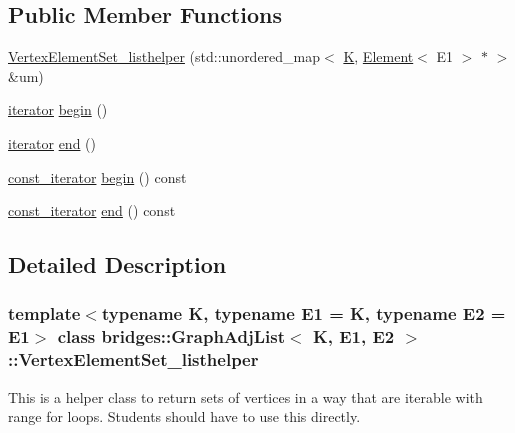 \subsection*{Public Member Functions}
\begin{DoxyCompactItemize}
\item 
\hyperlink{classbridges_1_1_graph_adj_list_1_1_vertex_element_set__listhelper_aad766132f1eb8eef63d8b5aae1131db0}{Vertex\+Element\+Set\+\_\+listhelper} (std\+::unordered\+\_\+map$<$ \hyperlink{namespacebridges_acfb0a4f7877d8f63de3e6862004c50edaa5f3c6a11b03839d46af9fb43c97c188}{K}, \hyperlink{classbridges_1_1_element}{Element}$<$ E1 $>$ $\ast$ $>$ \&um)
\item 
\hyperlink{classbridges_1_1_graph_adj_list_1_1_vertex_element_set__listhelper_1_1iterator}{iterator} \hyperlink{classbridges_1_1_graph_adj_list_1_1_vertex_element_set__listhelper_ad9feeff9bb589dc9d13d1dd562a0e7ea}{begin} ()
\item 
\hyperlink{classbridges_1_1_graph_adj_list_1_1_vertex_element_set__listhelper_1_1iterator}{iterator} \hyperlink{classbridges_1_1_graph_adj_list_1_1_vertex_element_set__listhelper_aea97cdb87e88d3848e6451d1cfc62f2d}{end} ()
\item 
\hyperlink{classbridges_1_1_graph_adj_list_1_1_vertex_element_set__listhelper_1_1const__iterator}{const\+\_\+iterator} \hyperlink{classbridges_1_1_graph_adj_list_1_1_vertex_element_set__listhelper_a9021945bdb83e3735fbc9b9a42f39a39}{begin} () const
\item 
\hyperlink{classbridges_1_1_graph_adj_list_1_1_vertex_element_set__listhelper_1_1const__iterator}{const\+\_\+iterator} \hyperlink{classbridges_1_1_graph_adj_list_1_1_vertex_element_set__listhelper_a7aff73080f67bec16219fd17d7f8bfd7}{end} () const
\end{DoxyCompactItemize}


\subsection{Detailed Description}
\subsubsection*{template$<$typename K, typename E1 = K, typename E2 = E1$>$\newline
class bridges\+::\+Graph\+Adj\+List$<$ K, E1, E2 $>$\+::\+Vertex\+Element\+Set\+\_\+listhelper}

This is a helper class to return sets of vertices in a way that are iterable with range for loops. Students should have to use this directly. 

